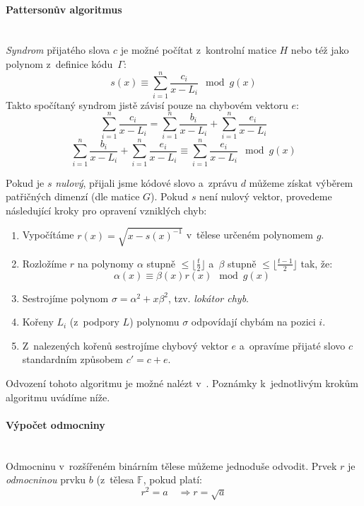 \documentclass[thesis=M,czech,hidelinks]{FITthesis}[2012/06/26]
\newcommand{\0}{{\textcolor[gray]{0.75}{0}}}
\begin{document}
\paragraph{Pattersonův algoritmus} \hfil \\
\emph{Syndrom} přijatého slova $c$ je možné počítat z~kontrolní matice $H$ nebo
též jako polynom z~definice kódu~$\Gamma$:
$$ s(x) \equiv \sum_{i=1}^{n}\frac{c_i}{x-L_i} \mod g(x) $$
Takto spočítaný syndrom jistě závisí pouze na chybovém vektoru $e$:
$$
    \sum_{i=1}^{n}\frac{c_i}{x-L_i} =
    \sum_{i=1}^{n}\frac{b_i}{x-L_i} + \sum_{i=1}^{n}\frac{e_i}{x-L_i}
$$
$$
    \sum_{i=1}^{n}\frac{b_i}{x-L_i} + \sum_{i=1}^{n}\frac{e_i}{x-L_i} \equiv
    \sum_{i=1}^{n}\frac{e_i}{x-L_i} \mod g(x)
$$

Pokud je $s$ \emph{nulový}, přijali jsme kódové slovo a~zprávu $d$ můžeme získat
výběrem patřičných dimenzí (dle matice $G$). Pokud $s$ není nulový vektor,
provedeme následující kroky pro opravení vzniklých chyb:


\begin{enumerate}
    \item Vypočítáme $r(x) = \sqrt{x-s(x)^{-1}}$ v~tělese určeném polynomem $g$.

    \item Rozložíme $r$ na polynomy $\alpha$ stupně $\leq \lfloor\frac{t}{2}\rfloor$
        a~$\beta$ stupně $\leq \lfloor\frac{t-1}{2}\rfloor$ tak, že:
        $$ \alpha(x) \equiv \beta(x) r(x) \mod g(x) $$

    \item Sestrojíme polynom $\sigma = \alpha^2 + x \beta^2$,
        tzv. \emph{lokátor chyb}.

    \item Kořeny $L_i$ (z~podpory $L$) polynomu $\sigma$ odpovídají chybám
        na pozici $i$.

    \item Z~nalezených kořenů sestrojíme chybový vektor $e$ a~opravíme přijaté
        slovo $c$ standardním způsobem $c' = c + e$.
\end{enumerate}

Odvození tohoto algoritmu je možné nalézt v~\cite{Patterson}. Poznámky
k~jednotlivým krokům algoritmu uvádíme níže.

\paragraph{Výpočet odmocniny} \hfil \\
Odmocninu v~rozšířeném binárním tělese můžeme jednoduše odvodit. Prvek $r$
je \emph{odmocninou} prvku $b$ (z~tělesa $\mathbb{F}$, pokud platí:
$$ r^2 = a \quad \Rightarrow r = \sqrt{a} $$
\end{document}
